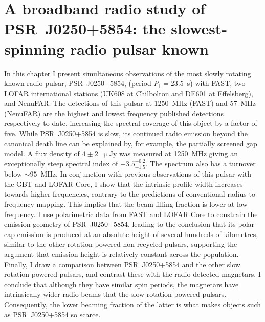 \chapter[A broadband radio study of PSR~J0250+5854]{A broadband radio study of PSR~J0250+5854: the slowest-spinning radio pulsar known}
\label{chapt: J0250}

In this chapter I present simultaneous observations of the most slowly rotating known radio pulsar, PSR~J0250+5854, (period $P_1 = 23.5$~s) with FAST, two LOFAR international stations (UK608 at Chilbolton and DE601 at Effelsberg), and NenuFAR. The detections of this pulsar at 1250~MHz (FAST) and 57~MHz (NenuFAR) are the highest and lowest frequency published detections respectively to date, increasing the spectral coverage of this object by a factor of five. While PSR~J0250+5854 is slow, its continued radio emission beyond the canonical death line can be explained by, for example, the partially screened gap model. A flux density of $4\pm2$~$\upmu$Jy was measured at 1250~MHz giving an exceptionally steep spectral index of $-3.5^{+0.2}_{-1.5}$. The spectrum also has a turnover below $\sim95$~MHz. In conjunction with previous observations of this pulsar with the GBT and LOFAR Core, I show that the intrinsic profile width increases towards higher frequencies, contrary to the predictions of conventional radius-to-frequency mapping. This implies that the beam filling fraction is lower at low frequency. I use polarimetric data from FAST and LOFAR Core to constrain the emission geometry of PSR~J0250+5854, leading to the conclusion that its polar cap emission is produced at an absolute height of several hundreds of kilometres, similar to the other rotation-powered non-recycled pulsars, supporting the argument that emission height is relatively constant across the population. Finally, I draw a comparison between PSR~J0250+5854 and the other slow rotation powered pulsars,  and contrast these with the radio-detected magnetars. I conclude that although they have similar spin periods, the magnetars have intrinsically wider radio beams that the slow rotation-powered pulsars. Consequently, the lower beaming fraction of the latter is what makes objects such as PSR~J0250+5854 so scarce.
